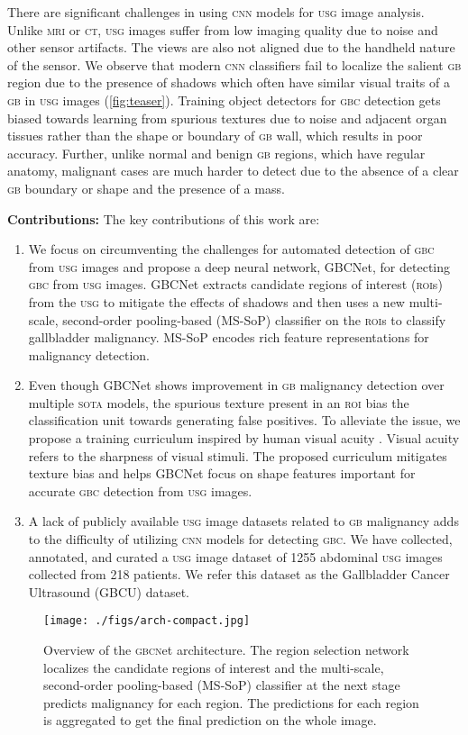 \documentclass[10pt,twocolumn,letterpaper]{article}
\def\sota{\textsc{sota}\xspace}
\def\cnn{\textsc{cnn}\xspace}
\def\usg{\textsc{usg}\xspace}
\def\gbc{\textsc{gbc}\xspace}
\def\gb{\textsc{gb}\xspace}
\def\mri{\textsc{mri}\xspace}
\def\ct{\textsc{ct}\xspace}
\def\roi{\textsc{roi}\xspace}
\def\rois{\textsc{roi}s\xspace}
\def\gbcnet{\textsc{gbcn}et\xspace}
\newcommand{\myfirstpara}[1]{\noindent \textbf{#1:}}
\newcommand{\mypara}[1]{\vspace{0.1em} \myfirstpara{#1}}
\begin{document}
There are significant challenges in using \cnn models for \usg image analysis. Unlike \mri or \ct, \usg images suffer from low imaging quality due to noise and other sensor artifacts. The views are also not aligned due to the handheld nature of the sensor. We observe that modern \cnn classifiers fail to localize the salient \gb region due to the presence of shadows which often have similar visual traits of a \gb in \usg images (\cref{fig:teaser}). Training object detectors for \gbc detection gets biased towards learning from spurious textures due to noise and adjacent organ tissues rather than the shape or boundary of \gb wall, which results in poor accuracy. Further, unlike normal and benign \gb regions, which have regular anatomy, malignant cases are much harder to detect due to the absence of a clear \gb boundary or shape and the presence of a mass.

\mypara{Contributions} 
The key contributions of this work are:
\vspace{-0.5em}
\begin{enumerate}[label=\textbf{(\arabic*)}]
\itemsep-0.5em
	\item We focus on circumventing the challenges for automated detection of \gbc from \usg images and propose a deep neural network, GBCNet, for detecting \gbc from \usg images. GBCNet extracts candidate regions of interest (\rois) from the \usg to mitigate the effects of shadows and then uses a new  multi-scale, second-order pooling-based (MS-SoP) classifier on the \rois to classify gallbladder malignancy.
MS-SoP encodes rich feature representations for malignancy detection. 
\item Even though GBCNet shows improvement in \gb malignancy detection over multiple \sota models, the spurious texture present in an \roi bias the classification unit towards generating false positives. To alleviate the issue, we propose a training curriculum inspired by human visual acuity \cite{kwon2016compensation, vogelsang2018VisualAcuity}. Visual acuity refers to the sharpness of visual stimuli. The proposed curriculum mitigates texture bias and helps GBCNet focus on shape features important for accurate \gbc detection from \usg images.\item A lack of publicly available \usg image datasets related to \gb malignancy adds to the difficulty of utilizing \cnn models for detecting \gbc. We have collected, annotated, and curated a \usg image dataset of 1255 abdominal \usg images collected from 218 patients. We refer this dataset as the Gallbladder Cancer Ultrasound (GBCU) dataset.
\end{enumerate}
 \begin{figure*}[t]
	\centering
	\texttt{[image: ./figs/arch-compact.jpg]}
	\caption{Overview of the \gbcnet architecture. The region selection network localizes the candidate regions of interest and the multi-scale, second-order pooling-based (MS-SoP) classifier at the next stage predicts malignancy for each region. The predictions for each region is aggregated to get the final prediction on the whole image.}
	\label{fig-arch-overview}
\end{figure*}
\end{document}

